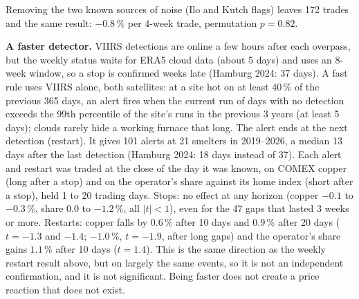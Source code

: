 \documentclass[10pt,a4paper]{article}
\begin{document}
Removing the two known sources of noise (Ilo and Kutch flags) leaves 172 trades and the same result: $-0.8$\,\% per 4-week trade, permutation $p=0.82$.

\textbf{A faster detector.} VIIRS detections are online a few hours after each overpass, but the weekly status waits for ERA5 cloud data (about 5 days) and uses an 8-week window, so a stop is confirmed weeks late (Hamburg 2024: 37 days). A fast rule uses VIIRS alone, both satellites: at a site hot on at least 40\,\% of the previous 365 days, an alert fires when the current run of days with no detection exceeds the 99th percentile of the site's runs in the previous 3 years (at least 5 days); clouds rarely hide a working furnace that long. The alert ends at the next detection (restart). It gives 101 alerts at 21 smelters in 2019--2026, a median 13 days after the last detection (Hamburg 2024: 18 days instead of 37). Each alert and restart was traded at the close of the day it was known, on COMEX copper (long after a stop) and on the operator's share against its home index (short after a stop), held 1 to 20 trading days. Stops: no effect at any horizon (copper $-0.1$ to $-0.3$\,\%, share $0.0$ to $-1.2$\,\%, all $|t|<1$), even for the 47 gaps that lasted 3 weeks or more. Restarts: copper falls by $0.6$\,\% after 10 days and $0.9$\,\% after 20 days ($t=-1.3$ and $-1.4$; $-1.0$\,\%, $t=-1.9$, after long gaps) and the operator's share gains $1.1$\,\% after 10 days ($t=1.4$). This is the same direction as the weekly restart result above, but on largely the same events, so it is not an independent confirmation, and it is not significant. Being faster does not create a price reaction that does not exist.
\end{document}
